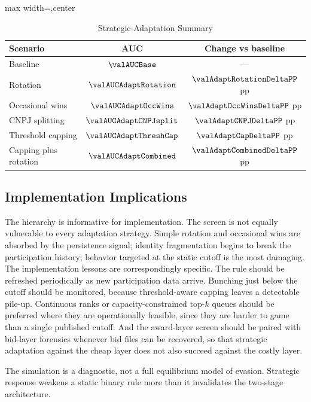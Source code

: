 \begin{table}[htbp]
\centering
\caption{Strategic-Adaptation Summary}
\label{tab:adaptation_summary_v18}
\footnotesize
\begin{adjustbox}{max width=\textwidth,center}
\begin{tabular}{p{4.4cm}cc}
\toprule
Scenario & AUC & Change vs baseline \\
\midrule
Baseline & $\valAUCBase$ & --- \\
Rotation & $\valAUCAdaptRotation$ & $\valAdaptRotationDeltaPP$ pp \\
Occasional wins & $\valAUCAdaptOccWins$ & $\valAdaptOccWinsDeltaPP$ pp \\
CNPJ splitting & $\valAUCAdaptCNPJsplit$ & $\valAdaptCNPJDeltaPP$ pp \\
Threshold capping & $\valAUCAdaptThreshCap$ & $\valAdaptCapDeltaPP$ pp \\
Capping plus rotation & $\valAUCAdaptCombined$ & $\valAdaptCombinedDeltaPP$ pp \\
\bottomrule
\end{tabular}
\end{adjustbox}
\end{table}

\subsection{Implementation Implications}
\label{app:adaptation_implementation_v18}

The hierarchy is informative for implementation. The screen is
not equally vulnerable to every adaptation strategy. Simple
rotation and occasional wins are absorbed by the persistence
signal; identity fragmentation begins to break the participation
history; behavior targeted at the static cutoff is the most
damaging. The implementation lessons are correspondingly
specific. The rule should be refreshed periodically as new
participation data arrive. Bunching just below the cutoff should
be monitored, because threshold-aware capping leaves a
detectable pile-up. Continuous ranks or capacity-constrained
top-$k$ queues should be preferred where they are operationally
feasible, since they are harder to game than a single published
cutoff. And the award-layer screen should be paired with
bid-layer forensics whenever bid files can be recovered, so
that strategic adaptation against the cheap layer does not also
succeed against the costly layer.

The simulation is a diagnostic, not a full equilibrium model of
evasion. Strategic response weakens a static binary rule more
than it invalidates the two-stage architecture.
